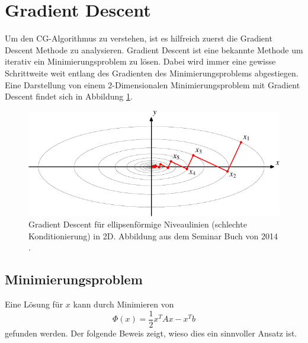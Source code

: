 %
%
%
\section{Gradient Descent\label{cg:section:steepest_descent}}

Um den CG-Algorithmus zu verstehen, ist es hilfreich zuerst die Gradient Descent Methode zu analysieren.
Gradient Descent ist eine bekannte Methode um iterativ ein Minimierungsproblem zu lösen.
Dabei wird immer eine gewisse Schrittweite weit entlang des Gradienten des Minimierungsproblems abgestiegen.
Eine Darstellung von einem 2-Dimensionalen Minimierungsproblem mit Gradient Descent findet sich in Abbildung \ref{cg:abb:steepest_descent}.

\begin{figure}
	
	\centering
	\includegraphics{papers/cg/images/descent-1}
	\caption{Gradient Descent für ellipsenförmige Niveaulinien (schlechte Konditionierung) in 2D. 
		Abbildung aus dem Seminar Buch von 2014 \cite{cg:book:hpc}.}
	\label{cg:abb:steepest_descent}
\end{figure}

\subsection{Minimierungsproblem \label{cg:subsection:Minimierungsproblem}}

Eine Lösung für $x$ kann durch Minimieren von
\begin{equation}
\Phi(x) = \frac{1}{2} x^T A x - x^T b
\end{equation}
gefunden werden.
Der folgende Beweis zeigt, wieso dies ein sinnvoller Ansatz ist.

